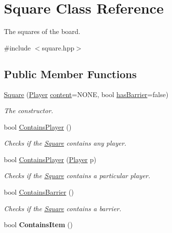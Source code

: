 \hypertarget{class_square}{\section{Square Class Reference}
\label{class_square}
}


The squares of the board.  




{\ttfamily \#include $<$square.\-hpp$>$}

\subsection*{Public Member Functions}
\begin{DoxyCompactItemize}
\item 
\hyperlink{class_square_aceee9ddfd86ad247ed3ddcdc16566d21}{Square} (\hyperlink{common_8hpp_a64071507b27c62fbdfefd4e0d29e5f81}{Player} \hyperlink{class_square_a927d50b9facba741730e47149e1d4d5c}{content}=N\-O\-N\-E, bool \hyperlink{class_square_ad45dd8efff3644a93ce040acee79a7ea}{has\-Barrier}=false)
\begin{DoxyCompactList}\small\item\em The constructor. \end{DoxyCompactList}\item 
bool \hyperlink{class_square_a9838192799e387c69cdb81476b46c05b}{Contains\-Player} ()
\begin{DoxyCompactList}\small\item\em Checks if the \hyperlink{class_square}{Square} contains any player. \end{DoxyCompactList}\item 
bool \hyperlink{class_square_a944e8df6fff00c13da33bb4cd7b390af}{Contains\-Player} (\hyperlink{common_8hpp_a64071507b27c62fbdfefd4e0d29e5f81}{Player} p)
\begin{DoxyCompactList}\small\item\em Checks if the \hyperlink{class_square}{Square} contains a particular player. \end{DoxyCompactList}\item 
bool \hyperlink{class_square_aa494f3342cdd923a6ed8aa3e1dfa78cd}{Contains\-Barrier} ()
\begin{DoxyCompactList}\small\item\em Checks if the \hyperlink{class_square}{Square} contains a barrier. \end{DoxyCompactList}\item 
\hypertarget{class_square_abf870b606aff7b6b3db6a312603bec3d}{bool {\bfseries Contains\-Item} ()}\label{class_square_abf870b606aff7b6b3db6a312603bec3d}


\end{DoxyCompactItemize}
